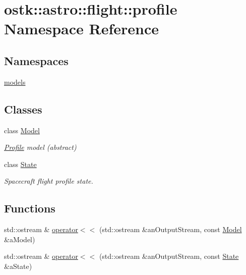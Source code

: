 \hypertarget{namespaceostk_1_1astro_1_1flight_1_1profile}{}\section{ostk\+:\+:astro\+:\+:flight\+:\+:profile Namespace Reference}
\label{namespaceostk_1_1astro_1_1flight_1_1profile}
\subsection*{Namespaces}
\begin{DoxyCompactItemize}
\item 
 \hyperlink{namespaceostk_1_1astro_1_1flight_1_1profile_1_1models}{models}
\end{DoxyCompactItemize}
\subsection*{Classes}
\begin{DoxyCompactItemize}
\item 
class \hyperlink{classostk_1_1astro_1_1flight_1_1profile_1_1_model}{Model}
\begin{DoxyCompactList}\small\item\em \hyperlink{classostk_1_1astro_1_1flight_1_1_profile}{Profile} model (abstract) \end{DoxyCompactList}\item 
class \hyperlink{classostk_1_1astro_1_1flight_1_1profile_1_1_state}{State}
\begin{DoxyCompactList}\small\item\em Spacecraft flight profile state. \end{DoxyCompactList}\end{DoxyCompactItemize}
\subsection*{Functions}
\begin{DoxyCompactItemize}
\item 
std\+::ostream \& \hyperlink{namespaceostk_1_1astro_1_1flight_1_1profile_a71513e36c79ebe7508be4aedb67d6a50}{operator$<$$<$} (std\+::ostream \&an\+Output\+Stream, const \hyperlink{classostk_1_1astro_1_1flight_1_1profile_1_1_model}{Model} \&a\+Model)
\item 
std\+::ostream \& \hyperlink{namespaceostk_1_1astro_1_1flight_1_1profile_ac541dd34ecd497de53634c897e4f5a07}{operator$<$$<$} (std\+::ostream \&an\+Output\+Stream, const \hyperlink{classostk_1_1astro_1_1flight_1_1profile_1_1_state}{State} \&a\+State)
\end{DoxyCompactItemize}



